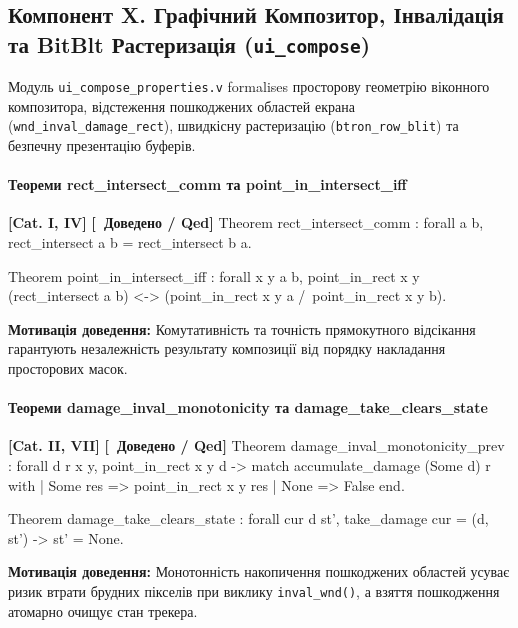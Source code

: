 \documentclass{article}
\let\originalfootnotesize\footnotesize
\let\oldverbatim\verbatim
\let\oldendverbatim\endverbatim
\renewenvironment{verbatim}{\originalfootnotesize\oldverbatim}{\oldendverbatim}
\newcommand{\thmcategory}[1]{{\small\textbf{\color{coreblue}[#1]}}}
\newcommand{\thmproven}{{\small\textbf{\color{productgreen}[\checkmark\ Доведено / Qed]}}}
\newcommand{\thmmotivation}[1]{%
  \par\smallskip\noindent\colorbox{boxbg}{\parbox{\dimexpr\linewidth-2\fboxsep\relax}{%
    \small\textbf{Мотивація доведення:} #1%
  }}\par\medskip
}
\begin{document}
\subsection[Компонент X. Графічний Композитор та BitBlt]{Компонент X. Графічний Композитор, Інвалідація та BitBlt Растеризація (\texttt{ui\_compose})}

Модуль \texttt{ui\_compose\_properties.v} formalises просторову геометрію віконного композитора, відстеження пошкоджених областей екрана (\texttt{wnd\_inval\_damage\_rect}), швидкісну растеризацію (\texttt{btron\_row\_blit}) та безпечну презентацію буферів.

\paragraph{Теореми rect\_intersect\_comm та point\_in\_intersect\_iff} \thmcategory{Cat. I, IV} \thmproven
\begin{verbatim}
Theorem rect_intersect_comm : forall a b,
  rect_intersect a b = rect_intersect b a.

Theorem point_in_intersect_iff : forall x y a b,
  point_in_rect x y (rect_intersect a b) <->
  (point_in_rect x y a /\ point_in_rect x y b).
\end{verbatim}
\thmmotivation{Комутативність та точність прямокутного відсікання гарантують незалежність результату композиції від порядку накладання просторових масок.}

\paragraph{Теореми damage\_inval\_monotonicity та damage\_take\_clears\_state} \thmcategory{Cat. II, VII} \thmproven
\begin{verbatim}
Theorem damage_inval_monotonicity_prev : forall d r x y,
  point_in_rect x y d ->
  match accumulate_damage (Some d) r with
  | Some res => point_in_rect x y res
  | None => False
  end.

Theorem damage_take_clears_state : forall cur d st',
  take_damage cur = (d, st') -> st' = None.
\end{verbatim}
\thmmotivation{Монотонність накопичення пошкоджених областей усуває ризик втрати брудних пікселів при виклику \texttt{inval\_wnd()}, а взяття пошкодження атомарно очищує стан трекера.}
\end{document}
